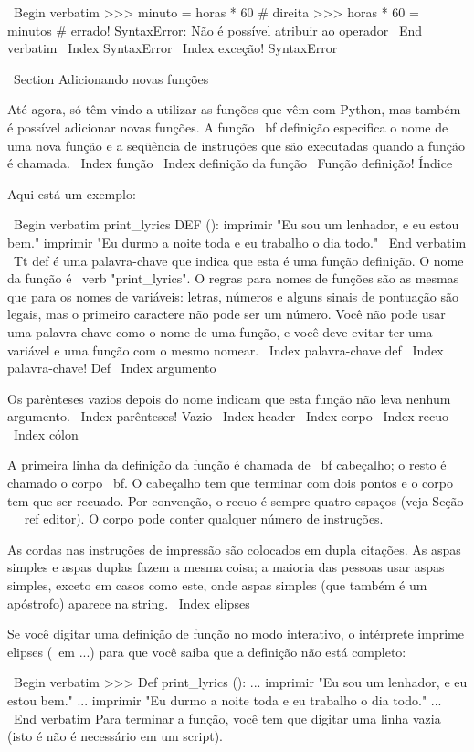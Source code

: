 \documentclass[10pt]{book}
\begin{document}
{\ Begin {verbatim}
>>> minuto = horas * 60 # direita
>>> horas * 60 = minutos # errado!
SyntaxError: Não é possível atribuir ao operador
\ End {verbatim}
%
\ Index {} SyntaxError
\ Index {exceção! SyntaxError}


\ Section {Adicionando novas funções}

Até agora, só têm vindo a utilizar as funções que vêm com Python,
mas também é possível adicionar novas funções.
A função {\ bf definição} especifica o nome de uma nova função e
a seqüência de instruções que são executadas quando a função é chamada.
\ Index {função}
\ Index {definição da função}
\ {Função definição!} Índice

Aqui está um exemplo:

\ Begin {verbatim}
print_lyrics DEF ():
    imprimir "Eu sou um lenhador, e eu estou bem."
    imprimir "Eu durmo a noite toda e eu trabalho o dia todo."
\ End {verbatim}
%
{\ Tt def} é uma palavra-chave que indica que esta é uma função
definição. O nome da função é \ verb "print_lyrics". O
regras para nomes de funções são as mesmas que para os nomes de variáveis: letras,
números e alguns sinais de pontuação são legais, mas o primeiro caractere
não pode ser um número. Você não pode usar uma palavra-chave como o nome de uma função,
e você deve evitar ter uma variável e uma função com o mesmo
nomear.
\ Index {palavra-chave def}
\ Index {palavra-chave! Def}
\ Index {argumento}

Os parênteses vazios depois do nome indicam que esta função
não leva nenhum argumento.
\ Index {parênteses! Vazio}
\ Index {header}
\ Index {corpo}
\ Index {recuo}
\ Index {} cólon

A primeira linha da definição da função é chamada de {\ bf cabeçalho};
o resto é chamado o corpo {\ bf}. O cabeçalho tem que terminar com dois pontos
e o corpo tem que ser recuado. Por convenção, o recuo é
sempre quatro espaços (veja Seção ~ \ ref {editor}). O corpo pode conter
qualquer número de instruções.

As cordas nas instruções de impressão são colocados em dupla
citações. As aspas simples e aspas duplas fazem a mesma coisa;
a maioria das pessoas usar aspas simples, exceto em casos como este, onde
aspas simples (que também é um apóstrofo) aparece na string.
\ Index {} elipses

Se você digitar uma definição de função no modo interativo, o intérprete
imprime elipses ({\ em ...}) para que você saiba que a definição
não está completo:

\ Begin {verbatim}
>>> Def print_lyrics ():
... imprimir "Eu sou um lenhador, e eu estou bem."
... imprimir "Eu durmo a noite toda e eu trabalho o dia todo."
...
\ End {verbatim}
%
Para terminar a função, você tem que digitar uma linha vazia (isto é
não é necessário em um script).

}
\end{document}
